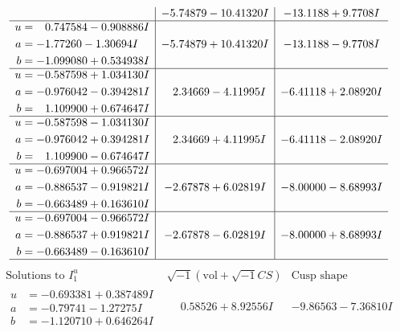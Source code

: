 \documentclass[1p]{elsarticle_modified}
\theoremstyle{definition}
\newcommand{\I}{\sqrt{-1}}
\begin{document}
$$\begin{array}{c|c|c}
 & -5.74879 - 10.41320 I & -13.1188 + 9.7708 I \\ \hline\begin{aligned}
u &= \phantom{-}0.747584 - 0.908886 I \\
a &= -1.77260 - 1.30694 I \\
b &= -1.099080 + 0.534938 I\end{aligned}
 & -5.74879 + 10.41320 I & -13.1188 - 9.7708 I \\ \hline\begin{aligned}
u &= -0.587598 + 1.034130 I \\
a &= -0.976042 - 0.394281 I \\
b &= \phantom{-}1.109900 + 0.674647 I\end{aligned}
 & \phantom{-}2.34669 - 4.11995 I & -6.41118 + 2.08920 I \\ \hline\begin{aligned}
u &= -0.587598 - 1.034130 I \\
a &= -0.976042 + 0.394281 I \\
b &= \phantom{-}1.109900 - 0.674647 I\end{aligned}
 & \phantom{-}2.34669 + 4.11995 I & -6.41118 - 2.08920 I \\ \hline\begin{aligned}
u &= -0.697004 + 0.966572 I \\
a &= -0.886537 - 0.919821 I \\
b &= -0.663489 + 0.163610 I\end{aligned}
 & -2.67878 + 6.02819 I & -8.00000 - 8.68993 I \\ \hline\begin{aligned}
u &= -0.697004 - 0.966572 I \\
a &= -0.886537 + 0.919821 I \\
b &= -0.663489 - 0.163610 I\end{aligned}
 & -2.67878 - 6.02819 I & -8.00000 + 8.68993 I\\
 \hline 
 \end{array}$$\newpage$$\begin{array}{c|c|c}  
\text{Solutions to }I^u_{1}& \I (\text{vol} + \sqrt{-1}CS) & \text{Cusp shape}\\
 \hline 
\begin{aligned}
u &= -0.693381 + 0.387489 I \\
a &= -0.79741 - 1.27275 I \\
b &= -1.120710 + 0.646264 I\end{aligned}
 & \phantom{-}0.58526 + 8.92556 I & -9.86563 - 7.36810 I \\ \hline\begin{aligned}

\end{aligned}
\end{array}$$
\end{document}
